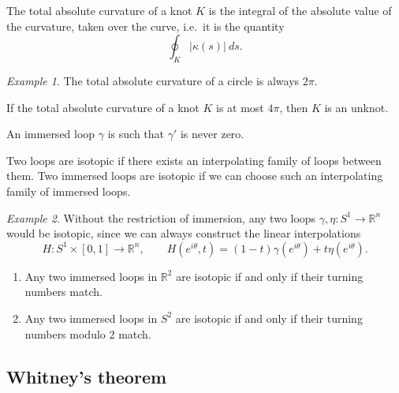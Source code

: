 \documentclass[11pt]{article}
\newcommand{\R}{\mathbb{R}}
\theoremstyle{definition}
\theoremstyle{remark}
\newtheorem*{example}{Example}
\numberwithin{equation}{section}
\begin{document}
    \begin{definition}
        The total absolute curvature of a knot $K$ is the integral of the absolute
        value of the curvature, taken over the curve, i.e.\ it is the quantity \[
            \oint_K |\kappa(s)|\:ds.
        \] 
    \end{definition}
    \begin{example}
        The total absolute curvature of a circle is always $2\pi$.
    \end{example}

    \begin{theorem}
        If the total absolute curvature of a knot $K$ is at most $4\pi$, then $K$ is
        an unknot.
    \end{theorem}

    \begin{definition}
        An immersed loop $\gamma$ is such that $\gamma'$ is never zero.
    \end{definition}

    \begin{definition}
        Two loops are isotopic if there exists an interpolating family of loops
        between them. Two immersed loops are isotopic if we can choose such an
        interpolating family of immersed loops.
    \end{definition}
    \begin{example}
        Without the restriction of immersion, any two loops $\gamma, \eta\colon S^1
        \to \R^n$ would be isotopic, since we can always construct the linear
        interpolations \[
            H\colon S^1 \times [0, 1] \to \R^n, \qquad
            H(e^{i\theta}, t) = (1 - t)\gamma(e^{i\theta}) + t\eta(e^{i\theta}).
        \] 
    \end{example}

    \begin{theorem}
        \mbox{}
        \begin{enumerate}
            \itemsep0em
            \item Any two immersed loops in $\R^2$ are isotopic if and only if their
            turning numbers match.
            \item Any two immersed loops in $S^2$ are isotopic if and only if their
            turning numbers modulo 2 match.
        \end{enumerate}
    \end{theorem}


    \subsection{Whitney's theorem}
    
\end{document}
